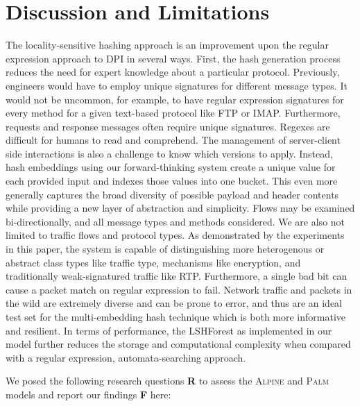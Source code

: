\section{Discussion and Limitations}

The locality-sensitive hashing approach is an improvement upon the regular expression approach to DPI in several ways. First, the hash generation process reduces the need for expert knowledge about a particular protocol. Previously, engineers would have to employ unique signatures for different message types. It would not be uncommon, for example, to have regular expression signatures for every method for a given text-based protocol like FTP or IMAP. Furthermore, requests and response messages often require unique signatures. Regexes are difficult for humans to read and comprehend. The management of server-client side interactions is also a challenge to know which versions to apply. Instead, hash embeddings using our forward-thinking system create a unique value for each provided input and indexes those values into one bucket. This even more generally captures the broad diversity of possible payload and header contents while providing a new layer of abstraction and simplicity. Flows may be examined bi-directionally, and all message types and methods considered. We are also not limited to traffic flows and protocol types. As demonstrated by the experiments in this paper, the system is capable of distinguishing more heterogenous or abstract class types like traffic type, mechanisms like encryption, and traditionally weak-signatured traffic like RTP. Furthermore, a single bad bit can cause a packet match on regular expression to fail. Network traffic and packets in the wild are extremely diverse and can be prone to error, and thus are an ideal test set for the multi-embedding hash technique which is both more informative and resilient. In terms of performance, the LSHForest as implemented in our model further reduces the storage and computational complexity when compared with a regular expression, automata-searching approach.

We posed the following research questions \textbf{R} to assess the \textsc{Alpine} and \textsc{Palm} models and report our findings \textbf{F} here:

